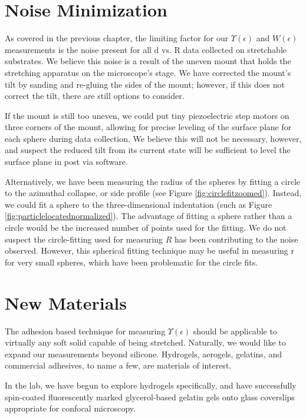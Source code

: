 \section{Noise Minimization}
As covered in the previous chapter, the limiting factor for our $ \Upsilon(\epsilon) $ and $ W(\epsilon) $ measurements is the noise present for all d vs. R data collected on stretchable substrates. We believe this noise is a result of the uneven mount that holds the stretching apparatus on the microscope's stage. We have corrected the mount's tilt by sanding and re-gluing the sides of the mount; however, if this does not correct the tilt, there are still options to consider. 

If the mount is still too uneven, we could put tiny piezoelectric step motors on three corners of the mount, allowing for precise leveling of the surface plane for each sphere during data collection. We believe this will not be necessary, however, and suspect the reduced tilt from its current state will be sufficient to level the surface plane in post via software.

Alternatively, we have been measuring the radius of the spheres by fitting a circle to the azimuthal collapse, or side profile (see Figure \ref{fig:circlefitzoomed}). Instead, we could fit a sphere to the three-dimensional indentation (such as Figure \ref{fig:particlelocatednormalized}). The advantage of fitting a sphere rather than a circle would be the increased number of points used for the fitting. We do not suspect the circle-fitting used for measuring $ R $ has been contributing to the noise observed. However, this spherical fitting technique may be useful in measuring r for very small spheres, which have been problematic for the circle fits.    


\section{New Materials}
The adhesion based technique for measuring $\Upsilon(\epsilon)$ should be applicable to virtually any soft solid capable of being stretched. Naturally, we would like to expand our measurements beyond silicone. Hydrogels, aerogels, gelatins, and commercial adhesives, to name a few, are materials of interest. 

In the lab, we have begun to explore hydrogels specifically, and have successfully spin-coated fluorescently marked glycerol-based gelatin gels onto glass coverslips appropriate for confocal microscopy. 


